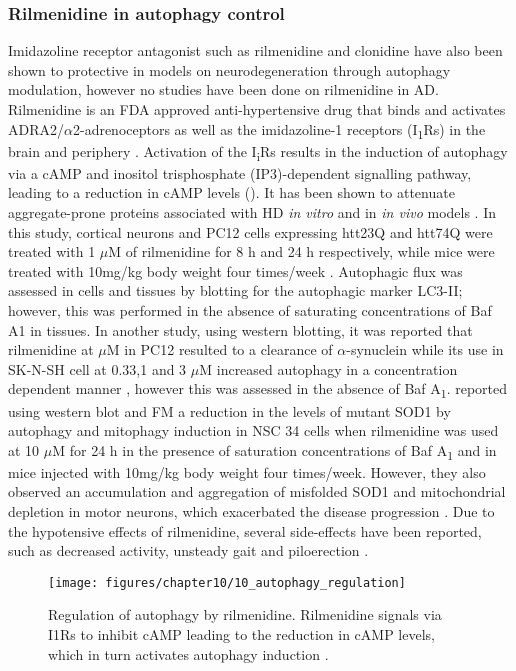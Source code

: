 \subsubsection{Rilmenidine in autophagy control}
Imidazoline receptor antagonist such as rilmenidine and clonidine have also been shown to protective in models on neurodegeneration through autophagy modulation, however no studies have been done on rilmenidine in AD. Rilmenidine is an FDA approved anti-hypertensive drug that binds and activates ADRA2/$\alpha$2-adrenoceptors as well as the imidazoline-1 receptors (I\textsubscript{1}Rs) in the brain and periphery \citep{Rose2010}. Activation of the I\textsubscript{i}Rs results in the induction of autophagy via a cAMP and inositol trisphosphate (IP3)-dependent signalling pathway, leading to a reduction in cAMP levels \citep{Williams2008} (). It has been shown to attenuate aggregate-prone proteins associated with HD \textit{in vitro} and in \textit{in vivo} models \citep{Rose2010}. In this study, cortical neurons and PC12 cells expressing htt23Q and htt74Q were treated with 1 $\mu$M of rilmenidine for 8 h and 24 h respectively, while mice were treated with 10mg/kg body weight four times/week \citep{Rose2010}. Autophagic flux was assessed in cells and tissues by blotting for the autophagic marker LC3-II; however, this was performed in the absence of saturating concentrations of Baf A1 in tissues. In another study, using western blotting, it was reported that rilmenidine at $\mu$M in PC12 resulted to a clearance of $\alpha$-synuclein while its use in SK-N-SH cell at 0.33,1 and 3 $\mu$M increased autophagy in a concentration dependent manner \citep{Williams2008}, however this was assessed in the absence of Baf A\textsubscript{1}. \citet{Perera2018} reported using western blot and FM a reduction in the levels of mutant SOD1 by autophagy and mitophagy induction in NSC 34 cells when rilmenidine was used at 10 $\mu$M for 24 h in the presence of saturation concentrations of Baf A\textsubscript{1} and in mice injected with 10mg/kg body weight four times/week. However, they also observed an accumulation and aggregation of misfolded SOD1 and mitochondrial depletion in motor neurons, which exacerbated the disease progression \citep{Perera2018}. Due to the hypotensive effects of rilmenidine, several side-effects have been reported, such as decreased activity, unsteady gait and piloerection \citep{Rose2010}.
 
\begin{figure}[!htbp]
  \texttt{[image: figures/chapter10/10\_autophagy\_regulation]}
  \caption[Regulation of autophagy by rilmenidine]{Regulation of autophagy by rilmenidine. Rilmenidine signals via I1Rs to inhibit cAMP leading to the reduction in cAMP levels, which in turn activates autophagy induction \citep{sarkar2013}.}
  \label{fig:10_autophagy_regulation}
\end{figure}

